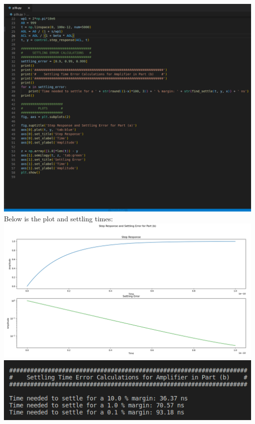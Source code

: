 \documentclass[12pt, fleqn]{article}
\begin{document}
\begin{enumerate}[label=(\alph*)]
{        \includegraphics[scale=0.3, center]{p3b_code2.PNG}\\[0.25cm]
        \newpage
        Below is the plot and settling times:\\[0.25cm]
        \includegraphics[scale=0.35, center]{p3b_plot.PNG}\\[0.25cm]
        \includegraphics[scale=0.65, center]{p3b_settle.PNG}\\[0.25cm]
        }

\end{enumerate}
\end{document}
